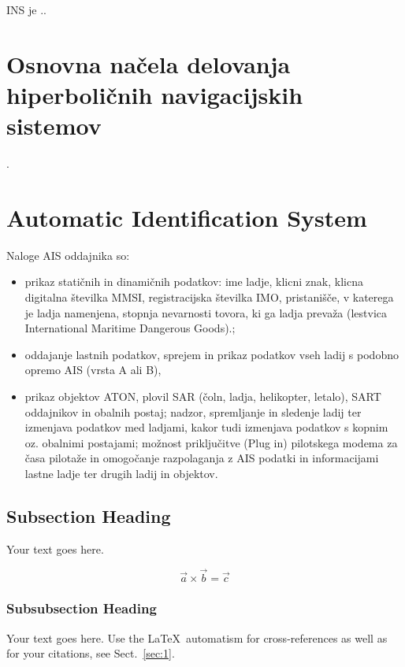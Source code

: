 INS je ..



\section{Osnovna načela delovanja hiperboličnih navigacijskih sistemov}
\label{sec:HiperbolSist}
\cite{monograph}.


\section{Automatic Identification System}
\label{sec:AIS}
Naloge AIS oddajnika so:
\begin{itemize}	
\item prikaz statičnih in dinamičnih podatkov: ime ladje, klicni znak, klicna digitalna številka MMSI, registracijska številka IMO, pristanišče, v katerega je ladja namenjena, stopnja nevarnosti tovora, ki ga ladja prevaža (lestvica International Maritime Dangerous Goods).;
\item oddajanje lastnih podatkov, sprejem in prikaz podatkov vseh ladij s podobno opremo AIS (vrsta A ali B), 
\item prikaz objektov ATON, plovil SAR (čoln, ladja, helikopter, letalo), SART oddajnikov in obalnih postaj;
nadzor, spremljanje in sledenje ladij ter izmenjava podatkov med ladjami, kakor tudi izmenjava podatkov s kopnim oz. obalnimi postajami;
možnost priključitve (Plug in) pilotskega modema za časa pilotaže in omogočanje razpolaganja z AIS podatki in informacijami lastne ladje ter drugih ladij in objektov.
\end{itemize}
\subsection{Subsection Heading}
\label{sec:2}
Your text goes here.

\begin{equation}
	\vec{a}\times\vec{b}=\vec{c}
\end{equation}

\subsubsection{Subsubsection Heading}
Your text goes here. Use the \LaTeX\ automatism for cross-references as
well as for your citations, see Sect.~\ref{sec:1}.


